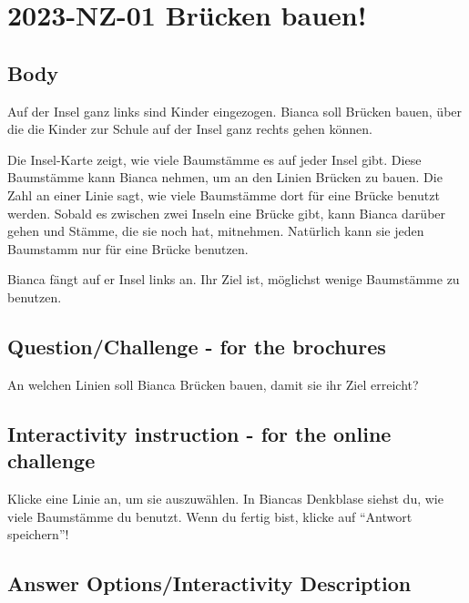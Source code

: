 \documentclass[a4paper,11pt]{report}
\newcommand{\taskGraphicsFolder}{..}
\begin{document}
\section*{\centering{} 2023-NZ-01 Brücken bauen!}


\subsection*{Body}

Auf der Insel ganz links sind Kinder eingezogen.
Bianca soll Brücken bauen, über die die Kinder zur Schule auf der Insel ganz rechts gehen können.

Die Insel-Karte zeigt, wie viele Baumstämme es auf jeder Insel gibt.
Diese Baumstämme kann Bianca nehmen, um an den Linien Brücken zu bauen.
Die Zahl an einer Linie sagt, wie viele Baumstämme dort für eine Brücke benutzt werden.
Sobald es zwischen zwei Inseln eine Brücke gibt, kann Bianca darüber gehen
und Stämme, die sie noch hat, mitnehmen.
Natürlich kann sie jeden Baumstamm nur für eine Brücke benutzen.

Bianca fängt auf er Insel links an.  Ihr Ziel ist, möglichst wenige Baumstämme zu benutzen.

{\em


\subsection*{Question/Challenge - for the brochures}

An welchen Linien soll Bianca Brücken bauen, damit sie ihr Ziel erreicht?

{\centering%
\par}

}


\subsection*{Interactivity instruction - for the online challenge}

Klicke eine Linie an, um sie auszuwählen. In Biancas Denkblase siehst du, wie viele Baumstämme du benutzt. Wenn du fertig bist, klicke auf \enquote{Antwort speichern}!

\begingroup
\renewcommand{\arraystretch}{1.5}
\subsection*{Answer Options/Interactivity Description}
\end{document}
